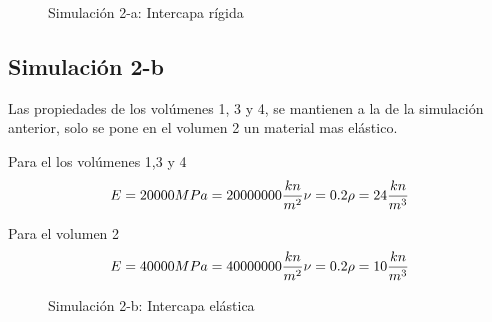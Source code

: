 \documentclass[12pt, a4paper]{article}
\begin{document}
\begin{figure}[h]
	\centering
	\caption{Simulación 2-a: Intercapa rígida}
\end{figure}

\subsection{Simulación 2-b}

Las propiedades de los volúmenes 1, 3 y 4, se mantienen a la de la simulación anterior, solo se pone en el volumen 2 un material mas elástico.

Para el los volúmenes 1,3 y 4
\begin{equation*}
	E=20000 MPa = 20000000 \frac{kn}{m^2} \\
	\nu = 0.2 \\
	\rho = 24 \frac{kn}{m^3}
\end{equation*}

Para el volumen 2
\begin{equation*}
	E=40000 MPa = 40000000 \frac{kn}{m^2} \\
	\nu = 0.2 \\
	\rho = 10 \frac{kn}{m^3}
\end{equation*}

\begin{figure}[h]
	\centering
	\caption{Simulación 2-b: Intercapa elástica}
\end{figure}
\end{document}
